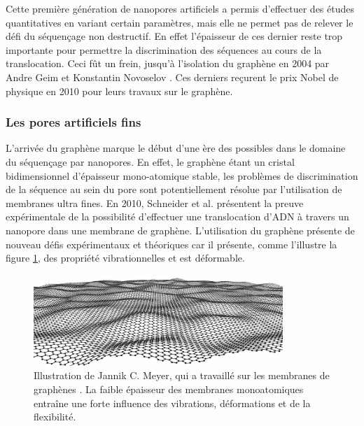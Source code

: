 Cette première génération de nanopores artificiels a permis d'effectuer des études quantitatives en variant certain paramètres, mais elle ne permet pas de relever le défi du séquençage non destructif. En effet l'épaisseur de ces dernier reste trop importante pour permettre la discrimination des séquences au cours de la translocation. Ceci fût un frein, jusqu'à l'isolation du graphène en 2004 par Andre Geim et Konstantin Novoselov \cite{Novoselov2004}. Ces derniers reçurent le prix Nobel de physique en 2010 pour leurs travaux sur le graphène.

\newpage

\subsubsection{Les pores artificiels fins}

L'arrivée du graphène marque le début d'une ère des possibles dans le domaine du séquençage par nanopores. En effet, le graphène étant un cristal bidimensionnel d'épaisseur mono-atomique stable, les problèmes de discrimination de la séquence au sein du pore sont potentiellement résolue par l'utilisation de membranes ultra fines. En 2010, Schneider et al. présentent la preuve expérimentale de la possibilité d'effectuer une translocation d'ADN à travers un nanopore dans une membrane de graphène\cite{Schneider2010}. L'utilisation du graphène présente de nouveau défis expérimentaux et théoriques car il présente, comme l'illustre la figure \ref{membvibgra}, des propriété vibrationnelles et est déformable.

\begin{figure}[h!]
\begin{center}
\includegraphics[width=0.84\textwidth]{vib.jpg}


\caption[Vibration et déformation d'une mono-couche de graphène]{Illustration de Jannik C. Meyer, qui a travaillé sur les membranes de graphènes \cite{Meyer2007}. La faible épaisseur des membranes monoatomiques entraîne une forte influence des vibrations, déformations et de la flexibilité.}
\label{membvibgra}
\end{center}
\end{figure}


